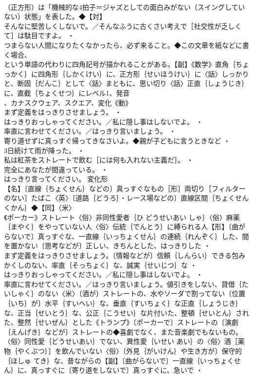 \documentclass[8pt]{extreport}
\begin{document}
\begin{CJK}{UTF8}{min}
\\	（正方形）は「機械的な4拍子＝ジャズとしての面白みがない（スイングしていない）状態」を表した。◆【対】
\\	そんなに堅苦しくしないで。／そんなふうに古くさい考えで［社交性が乏しくて］は駄目ですよ。 ・
\\	つまらない人間になりたくなかったら、必ず来ること。◆この文章を紙などに書く場合、
\\	という単語の代わりに四角記号が描かれることがある。【副】《数学》直角｛ちょっかく｝に四角形｛しかくけい｝に、正方形｛せいほうけい｝に〈話〉しっかりと、断固｛だんこ｝として〈話〉まともに、思い切り〈話〉正直｛しょうじき｝に、直截｛ちょくせつ｝にレベル1、発音
\\	、カナスクウェア、スクエア、変化《動》
\\	まず定義をはっきりさせましょう。 ・
\\	はっきりおっしゃってください。／私に隠し事はしないでよ。 ・
\\	率直に言わせてください。／はっきり言いましょう。 ・
\\	寄り道せずに真っすぐ帰ってきなさいよ。◆親が子どもに言うときなど ・
\\	3日続けて雨が降った。 ・
\\	私は紅茶をストレートで飲む［には何も入れない主義だ］。 ・
\\	完全にあなたが間違っている。 ・
\\	はっきり言ってください。	変化形 
\\	【名】〔直線｛ちょくせん｝などの〕真っすぐなもの［形］両切り［フィルターのない］たばこ〈英〉〔道路｛どうろ｝・レース場などの〕直線区間｛ちょくせん くかん｝◆【同】〈米〉
\\	《ポーカー》ストレート〈俗〉非同性愛者｛ひ どうせいあい しゃ｝〈俗〉麻薬｛まやく｝をやっていない人〈俗〉伝統｛でんとう｝に縛られる人【形】〔曲がらないで〕真っすぐな、一直線｛いっちょくせん｝の連続｛れんぞく｝した、間を置かない〔思考などが〕正しい、きちんとした、はっきりした ・
\\	まず定義をはっきりさせましょう。〔情報などが〕信頼｛しんらい｝できる包みかくしのない、率直｛そっちょく｝な、誠実｛せいじつ｝な ・
\\	はっきりおっしゃってください。／私に隠し事はしないでよ。 ・
\\	率直に言わせてください。／はっきり言いましょう。値引きをしない、貸借｛たいしゃく｝のない〈米〉〔酒が〕ストレートの、水やソーダで割ってない〔位置｛いち｝が〕水平｛すいへい｝な、垂直｛すいちょく｝な正直｛しょうじき｝な、正当｛せいとう｝な、公正｛こうせい｝な片付いた、整頓｛せいとん｝された、整然｛せいぜん｝とした《トランプ》〔ポーカーで〕ストレートの〔演劇｛えんげき｝などが〕ストレートの◆喜劇でなく、また音楽劇でもないもの。〈俗〉同性愛｛どうせいあい｝でない、異性愛｛いせい あい｝の〈俗〉酒［薬物｛やくぶつ｝］を飲んでいない〈俗〉〔外見｛がいけん｝や生き方が〕保守的｛ほしゅ てき｝な、昔ながらの【副】〔曲がらないで〕一直線｛いっちょくせん｝に、真っすぐに〔寄り道をしないで〕真っすぐに、急いで ・

\end{CJK}
\end{document}
